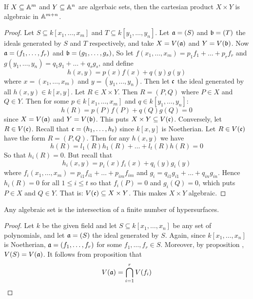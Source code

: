 \begin{proposition}\label{proposition_10.1.4}
  If $X \subseteq \A^m$ and $Y \subseteq \A^n$ are algerbaic sets,
  then the cartesian product $X \times Y$ is algebraic in $\A^{m+n}$.
\end{proposition}
\begin{proof}
  Let $S \subseteq k[x_1, \dots, x_m]$ and $T \subseteq k[y_1, \dots,
  y_n]$. Let $\af=(S)$ and $\bf=(T)$ the ideals generated by $S$
  and $T$ respectively, and take $X=V(\af)$ and $Y=V(\bf)$. Now
  $\af=(f_1, \dots, f_r)$ and $\bf=(g_1, \dots, g_s)$, So let
  $f(x_1, \dots, x_m)=p_1f_1+\dots+p_rf_r$ and
  $g(y_1, \dots, y_n)=q_1g_1+\dots+q_sg_s$, and define
  \begin{equation*}
    h(x,y)=p(x)f(x)+q(y)g(y)
  \end{equation*}
  where $x=(x_1, \dots, x_m)$ and $y=(y_1, \dots, y_n)$. Then let
  $\cf$ the ideal generated by all $h(x,y) \in k[x,y]$. Let $R \in X
  \times Y$. Then $R=(P,Q)$ where $P \in X$ and $Q \in Y$. Then for
  some $p \in k[x_1, \dots, x_m]$ and $q \in k[y_1, \dots, y_n]$:
  \begin{equation*}
    h(R)=p(P)f(P)+q(Q)g(Q)=0
  \end{equation*}
  since $X=V(\af)$ and $Y=V(\bf)$. This puts $X \times Y \subseteq
  V(\cf)$. Conversely, let $R \in V(\cf)$. Recall that $\cf=(h_1,
  \dots, h_t)$ since $k[x,y]$ is Noetherian. Let $R \in V(\cf)$ have
  the form $R=(P,Q)$. Then for any $h(x,y)$ we have
  \begin{equation*}
    h(R)=l_1(R)h_1(R)+\dots+l_t(R)h(R)=0
  \end{equation*}
  So that $h_i(R)=0$. But recall that
  \begin{equation*}
    h_i(x,y)=p_i(x)f_i(x)+q_i(y)g_i(y)
  \end{equation*}
  where $f_i(x_1, \dots, x_m)=p_{i1}f_{i1}+\dots+p_{im}f_{im}$ and
  $g_i=q_{i1}g_{i1}+\dots+q_{in}g_{in}$. Hence $h_i(R)=0$ for all $1
  \leq i \leq t$ so that $f_i(P)=0$ and $g_i(Q)=0$, which puts $P \in
  X$ and $Q \in Y$. That is: $V(\cf) \subseteq X \times Y$. This makes
  $X \times Y$ algebraic.
\end{proof}

\begin{theorem}\label{theorem_10.1.5}
  Any algebraic set is the intersection of a finite number of
  hypersurfaces.
\end{theorem}
\begin{proof}
  Let $k$ be the given field and let $S \subseteq k[x_1, \dots, x_n]$
  be any set of polynomials, and let $\af=(S)$ the ideal generated by
  $S$. Again, since $k[x_1, \dots, x_n]$ is Noetherian, $\af=(f_1,
  \dots, f_r)$ for some $f_1, \dots, f_r \in S$. Moreover, by
  proposition \label{proposition_10.1.2}, $V(S)=V(\af)$. It follows
  from proposition \label{proposition_10.1.1} that
  \begin{equation*}
    V(\af)=\bigcap_{i=1}^r{V(f_i)}
  \end{equation*}
\end{proof}
